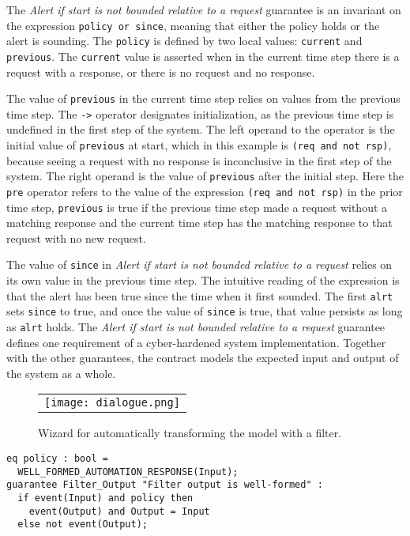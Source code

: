 The \emph{Alert if start is not bounded relative to a request}
guarantee is an invariant on the expression \texttt{policy or since},
meaning that either the policy holds or the alert is
sounding. The \texttt{policy} is defined by two local
values: \texttt{current} and \texttt{previous}. The \texttt{current}
value is asserted when in the current time step there is a request
with a response, or there is no request and no response.

The value of \texttt{previous} in the current time step relies on values from the previous time step. The \texttt{->} operator designates initialization, as the previous time step is undefined in the first step of the system. The left operand to the operator is the initial value of \texttt{previous} at start, which in this example is \texttt{(req and not rsp)}, because seeing a request with no response is inconclusive in the first step of the system. The right operand is the value of \texttt{previous} after the initial step. Here the \texttt{pre} operator refers to the value of the expression \texttt{(req and not rsp)} in the prior time step, \texttt{previous} is true if the previous time step made a request without a matching response and the current time step has the matching response to that request with no new request.

The value of \texttt{since} in \emph{Alert if start is not bounded relative to a request} relies on its own value in the previous time step. The intuitive reading of the expression is that the alert has been true since the time when it first sounded. The first \texttt{alrt} sets \texttt{since} to true, and once the value of \texttt{since} is true, that value persists as long as \texttt{alrt} holds. The \emph{Alert if start is not bounded relative to a request} guarantee defines one requirement of a cyber-hardened system implementation. Together with the other guarantees, the contract models the expected input and output of the system as a whole.

\begin{figure}
  \begin{center}
    \begin{tabular}{c}
      \texttt{[image: dialogue.png]}
    \end{tabular}
  \end{center}
  \caption{Wizard for automatically transforming the model with a filter.}
  \label{fig:dialogue}
\end{figure}

\newsavebox{\flt}
\begin{lrbox}{\flt}
\begin{lstlisting}[style=agree]
eq policy : bool =
  WELL_FORMED_AUTOMATION_RESPONSE(Input);
guarantee Filter_Output "Filter output is well-formed" :
  if event(Input) and policy then
    event(Output) and Output = Input
  else not event(Output);
\end{lstlisting}
\end{lrbox}

